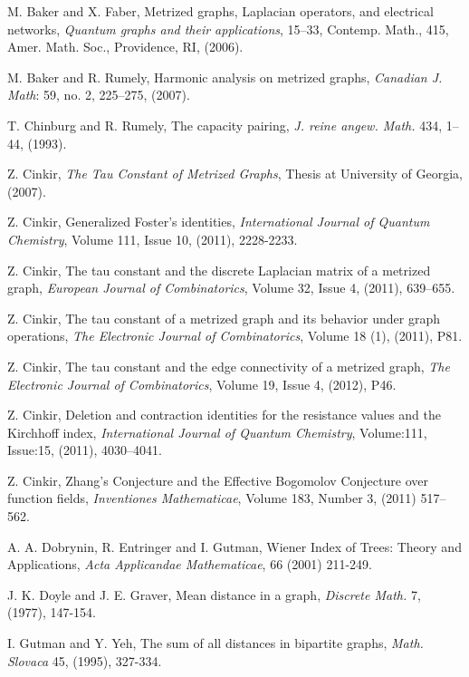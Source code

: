 \documentclass[12pt]{amsart}
\theoremstyle{example}
\theoremstyle{definition}
\theoremstyle{notation}
\begin{document}
\begin{thebibliography}{999}

 M. Baker and X. Faber, Metrized graphs, Laplacian operators, and
electrical networks, {\em Quantum graphs and their applications}, 15--33,
Contemp. Math., 415, Amer. Math. Soc., Providence, RI, (2006).

 M. Baker and R. Rumely, Harmonic analysis on metrized graphs, {\em Canadian
J. Math}: 59, no. 2, 225--275, (2007).

 T. Chinburg and R. Rumely, The capacity pairing,
{\em J. reine angew. Math.}  434, 1--44, (1993).

 Z. Cinkir, {\em The Tau Constant of Metrized Graphs},
Thesis at University of Georgia, (2007).

Z. Cinkir, Generalized Foster's identities, {\em International Journal of Quantum Chemistry}, Volume 111, Issue 10, (2011), 2228-2233.

 Z. Cinkir, The tau constant and the discrete Laplacian matrix of a metrized graph, {\em European Journal of Combinatorics}, Volume 32, Issue 4, (2011), 639--655.

 Z. Cinkir, The tau constant of a metrized graph and its behavior under graph operations, {\em The Electronic Journal of Combinatorics}, Volume 18 (1), (2011), P81.

 Z. Cinkir, The tau constant and the edge connectivity of a metrized graph,
{\em The Electronic Journal of Combinatorics}, Volume 19, Issue 4, (2012), P46.

 Z. Cinkir, Deletion and contraction identities for the resistance values and the Kirchhoff index,
{\em International Journal of Quantum Chemistry}, Volume:111, Issue:15, (2011), 4030--4041.

 Z. Cinkir, Zhang's Conjecture and the Effective Bogomolov Conjecture over function fields, {\em Inventiones Mathematicae}, Volume 183, Number 3, (2011) 517--562.

 A. A. Dobrynin, R. Entringer and I. Gutman, Wiener Index of Trees: Theory and Applications, {\em Acta Applicandae Mathematicae}, 66 (2001) 211-249.

J. K. Doyle and J. E. Graver, Mean distance in a graph, {\em Discrete Math. } 7, (1977), 147-154.

 I. Gutman and Y. Yeh, The sum of all distances in bipartite graphs, {\em Math. Slovaca} 45, (1995), 327-334.


\end{thebibliography}
\end{document}
